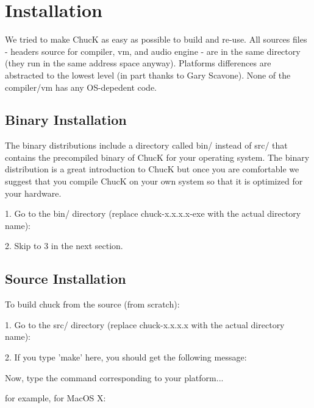 \chapter{Installation}

We tried to make ChucK as easy as possible to build and re-use. All 
sources files - headers source for compiler, vm, and audio engine - are 
in the same directory (they run in the same address space anyway). Platforms 
differences are abstracted to the lowest level (in part thanks to Gary 
Scavone). None of the compiler/vm has any OS-depedent code. 

\section{Binary Installation}

The binary distributions include a directory called bin/ instead of src/ that contains the precompiled binary of ChucK for your operating system. The binary distribution is a great introduction to ChucK but once you are comfortable we suggest that you compile ChucK on your own system so that it is optimized for your hardware. 

1. Go to the bin/ directory (replace chuck-x.x.x.x-exe with the actual 
directory name):


2. Skip to 3 in the next section.


\section{Source Installation}

To build chuck from the source (from scratch): 

1. Go to the src/ directory (replace chuck-x.x.x.x with the actual 
directory name):



2. If you type 'make' here, you should get the following message:


Now, type the command corresponding to your platform... 

for example, for MacOS X:

